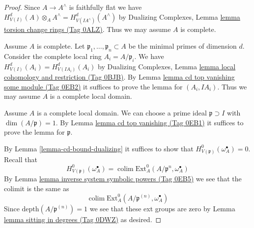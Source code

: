 \documentclass{amsart}
\theoremstyle{plain}
\theoremstyle{definition}
\theoremstyle{remark}
\numberwithin{equation}{subsection}
\def\colim{\mathop{\mathrm{colim}}\nolimits}
\begin{document}
\begin{proof}
Since $A \to A^\wedge$ is faithfully flat we have
$H^d_{V(I)}(A) \otimes_A A^\wedge = H^d_{V(IA^\wedge)}(A^\wedge)$
by Dualizing Complexes, Lemma \href{https://stacks.math.columbia.edu/tag/0ALZ}{lemma torsion change rings (Tag 0ALZ)}.
Thus we may assume $A$ is complete.

\medskip\noindent
Assume $A$ is complete. Let $\mathfrak p_1, \ldots, \mathfrak p_n \subset A$
be the minimal primes of dimension $d$. Consider the complete local ring
$A_i = A/\mathfrak p_i$. We have $H^d_{V(I)}(A_i) = H^d_{V(IA_i)}(A_i)$
by Dualizing Complexes, Lemma
\href{https://stacks.math.columbia.edu/tag/0BJB}{lemma local cohomology and restriction (Tag 0BJB)}.
By Lemma \href{https://stacks.math.columbia.edu/tag/0EB2}{lemma cd top vanishing some module (Tag 0EB2)}
it suffices to prove the lemma for $(A_i, IA_i)$.
Thus we may assume $A$ is a complete local domain.

\medskip\noindent
Assume $A$ is a complete local domain. We can choose a prime ideal
$\mathfrak p \supset I$ with $\dim(A/\mathfrak p) = 1$.
By Lemma \href{https://stacks.math.columbia.edu/tag/0EB1}{lemma cd top vanishing (Tag 0EB1)}
it suffices to prove the lemma for $\mathfrak p$.

\medskip\noindent
By Lemma \ref{lemma-cd-bound-dualizing} it suffices to show that
$H^0_{V(\mathfrak p)}(\omega_A^\bullet) = 0$.
Recall that
$$
H^0_{V(\mathfrak p)}(\omega_A^\bullet) =
\colim \text{Ext}^0_A(A/\mathfrak p^n, \omega_A^\bullet)
$$
By Lemma \href{https://stacks.math.columbia.edu/tag/0EB5}{lemma inverse system symbolic powers (Tag 0EB5)}
we see that the colimit is the same as
$$
\colim \text{Ext}^0_A(A/\mathfrak p^{(n)}, \omega_A^\bullet)
$$
Since $\text{depth}(A/\mathfrak p^{(n)}) = 1$ we see that
these ext groups are zero by Lemma \href{https://stacks.math.columbia.edu/tag/0DWZ}{lemma sitting in degrees (Tag 0DWZ)}
as desired.
\end{proof}
\end{document}
